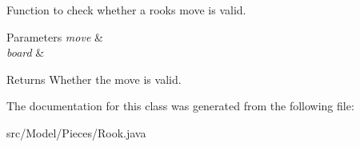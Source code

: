 Function to check whether a rook\textquotesingle{}s move is valid. 
\begin{DoxyParams}{Parameters}
{\em move} & \\
\hline
{\em board} & \\
\hline
\end{DoxyParams}
\begin{DoxyReturn}{Returns}
Whether the move is valid. 
\end{DoxyReturn}


The documentation for this class was generated from the following file\+:\begin{DoxyCompactItemize}
\item 
src/\+Model/\+Pieces/Rook.\+java\end{DoxyCompactItemize}
